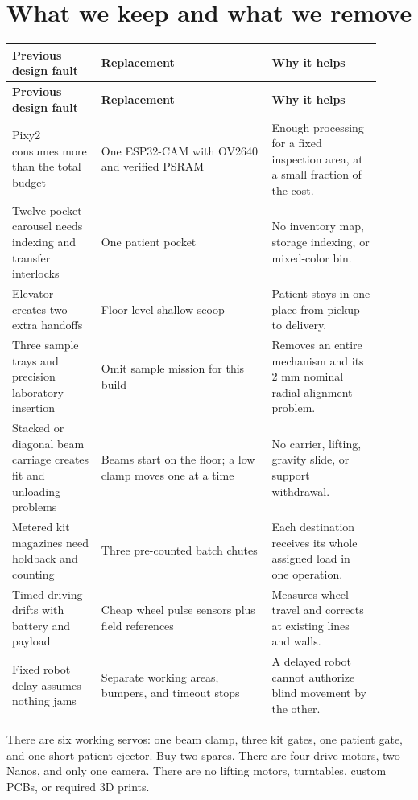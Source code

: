 \documentclass[10pt,a4paper]{article}
\begin{document}
\section{What we keep and what we remove}
\small\begin{longtable}{@{}>{\raggedright\arraybackslash}p{0.22\linewidth}>{\raggedright\arraybackslash}p{0.42\linewidth}>{\raggedright\arraybackslash}p{0.27\linewidth}@{}}
\toprule
\textbf{Previous design fault} & \textbf{Replacement} & \textbf{Why it helps} \\
\midrule\endfirsthead
\toprule\textbf{Previous design fault} & \textbf{Replacement} & \textbf{Why it helps} \\\midrule\endhead
Pixy2 consumes more than the total budget & One ESP32-CAM with OV2640 and verified PSRAM & Enough processing for a fixed inspection area, at a small fraction of the cost. \\[3pt]
Twelve-pocket carousel needs indexing and transfer interlocks & One patient pocket & No inventory map, storage indexing, or mixed-color bin. \\[3pt]
Elevator creates two extra handoffs & Floor-level shallow scoop & Patient stays in one place from pickup to delivery. \\[3pt]
Three sample trays and precision laboratory insertion & Omit sample mission for this build & Removes an entire mechanism and its 2 mm nominal radial alignment problem. \\[3pt]
Stacked or diagonal beam carriage creates fit and unloading problems & Beams start on the floor; a low clamp moves one at a time & No carrier, lifting, gravity slide, or support withdrawal. \\[3pt]
Metered kit magazines need holdback and counting & Three pre-counted batch chutes & Each destination receives its whole assigned load in one operation. \\[3pt]
Timed driving drifts with battery and payload & Cheap wheel pulse sensors plus field references & Measures wheel travel and corrects at existing lines and walls. \\[3pt]
Fixed robot delay assumes nothing jams & Separate working areas, bumpers, and timeout stops & A delayed robot cannot authorize blind movement by the other. \\[3pt]
\bottomrule\end{longtable}\normalsize
There are six working servos: one beam clamp, three kit gates, one patient gate, and one short patient ejector. Buy two spares. There are four drive motors, two Nanos, and only one camera. There are no lifting motors, turntables, custom PCBs, or required 3D prints.
\end{document}
